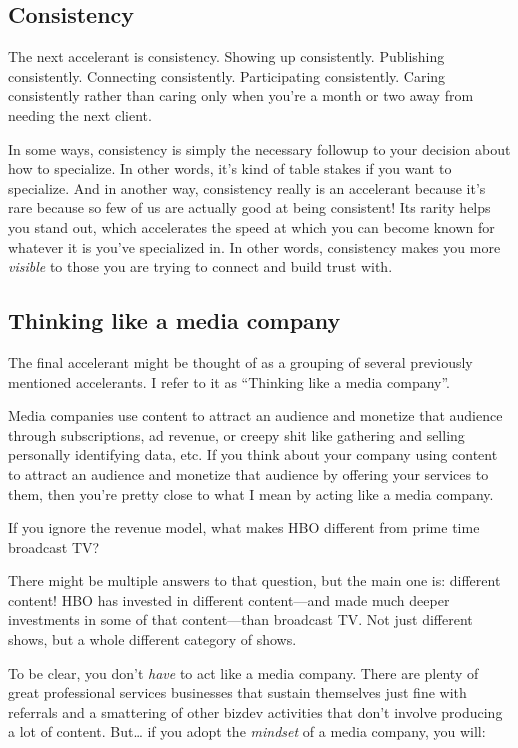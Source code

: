 \subsection{Consistency}

The next accelerant is consistency. Showing up consistently. Publishing consistently. Connecting consistently. Participating consistently. Caring consistently rather than caring only when you’re a month or two away from needing the next client.

In some ways, consistency is simply the necessary followup to your decision about how to specialize. In other words, it’s kind of table stakes if you want to specialize. And in another way, consistency really is an accelerant because it’s rare because so few of us are actually good at being consistent! Its rarity helps you stand out, which accelerates the speed at which you can become known for whatever it is you’ve specialized in. In other words, consistency makes you more \emph{visible} to those you are trying to connect and build trust with.

\subsection{Thinking like a media company}

The final accelerant might be thought of as a grouping of several previously mentioned accelerants. I refer to it as “Thinking like a media company”.

Media companies use content to attract an audience and monetize that audience through subscriptions, ad revenue, or creepy shit like gathering and selling personally identifying data, etc. If you think about your company using content to attract an audience and monetize that audience by offering your services to them, then you’re pretty close to what I mean by acting like a media company.

If you ignore the revenue model, what makes HBO different from prime time broadcast TV?

There might be multiple answers to that question, but the main one is: different content! HBO has invested in different content—and made much deeper investments in some of that content—than broadcast TV. Not just different shows, but a whole different category of shows.

To be clear, you don’t \emph{have} to act like a media company. There are plenty of great professional services businesses that sustain themselves just fine with referrals and a smattering of other bizdev activities that don’t involve producing a lot of content. But… if you adopt the \emph{mindset} of a media company, you will:

